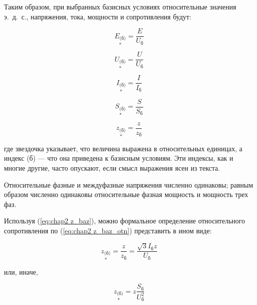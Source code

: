 Таким образом, при выбранных базисных условиях относительные значения э.~д.~с., напряжения, тока, мощности и сопротивления будут:

\begin{equation} %
	\label{eq:chap2 E_baz_otn}
	\underset{*}{E_{\text{(б)}}} = \frac{E}{U_{\text{б}}}
\end{equation}

\begin{equation} %
	\label{eq:chap2 U_baz_otn}
	\underset{*}{U_{\text{(б)}}} = \frac{U}{U_{\text{б}}}
\end{equation}

\begin{equation} %
	\label{eq:chap2 I_baz_otn}
	\underset{*}{I_{\text{(б)}}} = \frac{I}{I_{\text{б}}}
\end{equation}

\begin{equation} %
	\label{eq:chap2 S_baz_otn}
	\underset{*}{S_{\text{(б)}}} = \frac{S}{S_{\text{б}}}
\end{equation}

\begin{equation} %
	\label{eq:chap2 z_baz_otn}
	\underset{*}{z_{\text{(б)}}} = \frac{z}{z_{\text{б}}}
\end{equation}

где звездочка указывает, что величина выражена в относительных единицах, а индекс (б) --- что она приведена к базисным условиям. Эти индексы, как и многие другие, часто опускают, если смысл выражения ясен из текста.

Относительные фазные и междуфазные напряжения численно одинаковы; равным образом численно одинаковы относительные фазная мощность и мощность трех фаз.

Используя (\ref{eq:chap2 z_baz}), можно формальное определение относительного сопротивления по (\ref{eq:chap2 z_baz_otn}) представить в ином виде:

\begin{equation} %
	\label{eq:chap2 z_baz_otn 2}
	\underset{*}{z_{\text{(б)}}} = \frac{z}{z_{\text{б}}} = \frac{\sqrt{3}I_{\text{б}}z}{U_{\text{б}}}
\end{equation}

или, иначе,

\begin{equation} %
	\label{eq:chap2 z_baz_otn 3}
	\underset{*}{z_{\text{(б)}}} = z\frac{S_{\text{б}}}{U_{\text{б}}^{2}}
\end{equation}

